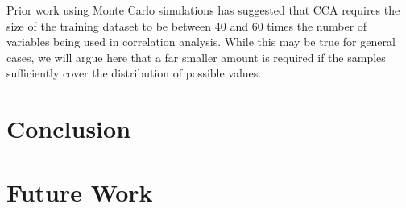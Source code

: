 Prior work \cite{barcikowski} using Monte Carlo simulations has suggested that CCA requires the size of the training dataset to be between 40 and 60 times the number of variables being used in correlation analysis. While this may be true for general cases, we will argue here that a far smaller amount is required if the samples sufficiently cover the distribution of possible values.


\chapter{Conclusion}
\label{cpt:conclusion}

\chapter{Future Work}
\label{cpt:future}